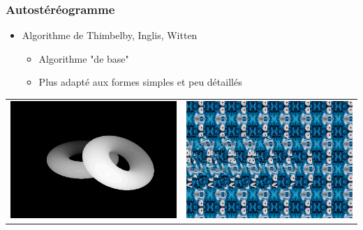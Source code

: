 \documentclass{beamer}
\begin{document}
\begin{frame}
\frametitle{Autostéréogramme}
\begin{itemize}[label=$\bullet$]
\item Algorithme de Thimbelby, Inglis, Witten \cite{stereogram}
	\begin{itemize}[label=$\circ$]
	\item Algorithme "de base"
	\item Plus adapté aux formes simples et peu détaillés
	\end{itemize}
\end{itemize}

\begin{tabular}{l|r}
\centering
\includegraphics[scale=0.22]{donutdepth.png}
&
\centering
\includegraphics[scale=0.22]{donut1.png}
\end{tabular}

\end{frame}
\end{document}
